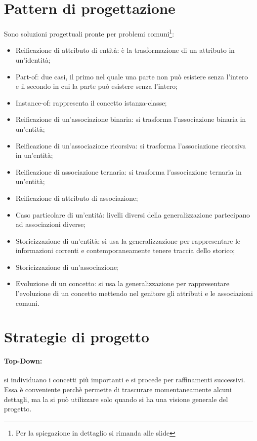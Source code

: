\section{Pattern di progettazione}

Sono soluzioni progettuali pronte per problemi comuni\footnote{Per la spiegazione in dettaglio si rimanda alle slide}:

\begin{itemize}
    \item Reificazione di attributo di entità: è la trasformazione di un attributo in un'identità;
    \item Part-of: due casi, il primo nel quale una parte non può esistere senza l'intero e il secondo in cui la parte può esistere senza l'intero;
    \item Instance-of: rappresenta il concetto istanza-classe;
    \item Reificazione di un'associazione binaria: si trasforma l'associazione binaria in un'entità;
    \item Reificazione di un'associazione ricorsiva: si trasforma l'associazione ricorsiva in un'entità;
    \item Reificazione di associazione ternaria: si trasforma l'associazione ternaria in un'entità;
    \item Reificazione di attributo di associazione;
    \item Caso particolare di un'entità: livelli diversi della generalizzazione partecipano ad associazioni diverse;
    \item Storicizzazione di un’entità: si usa la generalizzazione per rappresentare le informazioni correnti e contemporaneamente tenere traccia dello storico;
    \item Storicizzazione di un’associazione;
    \item Evoluzione di un concetto: si usa la generalizzazione per rappresentare l’evoluzione di un concetto mettendo nel genitore gli attributi e le associazioni comuni.
\end{itemize}

\section{Strategie di progetto}

\paragraph{Top-Down:} si individuano i concetti più importanti e si procede per raffinamenti successivi. Essa è conveniente perchè permette di trascurare momentaneamente alcuni dettagli, ma la si può utilizzare solo quando si ha una visione generale del progetto.

